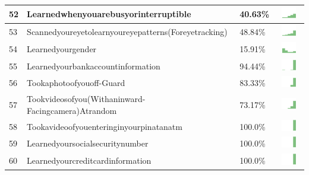 \begin{table}[t]
\begin{center}
\begin{tabular}{| p{0.5cm} | p{7cm} | p{1cm} | c |}
52 & Learnedwhenyouarebusyorinterruptible & 40.63\% & \includegraphics[width = 2cm, height = 0.5cm]{../learnedwhenyouarebusyorinterruptibleFRIENDS} \\ \hline 
53 & Scannedyoureyetolearnyoureyepatterns(Foreyetracking) & 48.84\% & \includegraphics[width = 2cm, height = 0.5cm]{../scannedyoureyetolearnyoureyepatterns(foreyetracking)FRIENDS} \\ \hline 
54 & Learnedyourgender & 15.91\% & \includegraphics[width = 2cm, height = 0.5cm]{../learnedyourgenderFRIENDS} \\ \hline 
55 & Learnedyourbankaccountinformation & 94.44\% & \includegraphics[width = 2cm, height = 0.5cm]{../learnedyourbankaccountinformationFRIENDS} \\ \hline 
56 & Tookaphotoofyouoff-Guard & 83.33\% & \includegraphics[width = 2cm, height = 0.5cm]{../tookaphotoofyouoff-guardFRIENDS} \\ \hline 
57 & Tookvideosofyou(Withaninward-Facingcamera)Atrandom & 73.17\% & \includegraphics[width = 2cm, height = 0.5cm]{../tookvideosofyou(withaninward-facingcamera)atrandomFRIENDS} \\ \hline 
58 & Tookavideoofyouenteringinyourpinatanatm & 100.0\% & \includegraphics[width = 2cm, height = 0.5cm]{../tookavideoofyouenteringinyourPINatanATMFRIENDS} \\ \hline 
59 & Learnedyoursocialsecuritynumber & 100.0\% & \includegraphics[width = 2cm, height = 0.5cm]{../learnedyoursocialsecuritynumberFRIENDS} \\ \hline 
60 & Learnedyourcreditcardinformation & 100.0\% & \includegraphics[width = 2cm, height = 0.5cm]{../learnedyourcreditcardinformationFRIENDS} \\ \hline 

\end{tabular}
\end{center}
\end{table}
